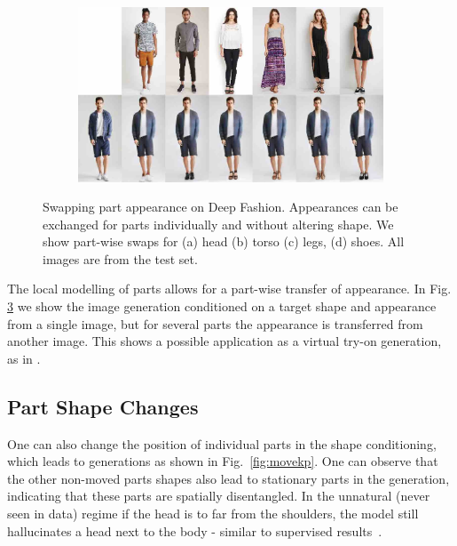 \begin{figure}[htp]
\begin{subfigure}{0.49\linewidth}
		\label{fig:part3_21}
		\end{subfigure}
		\begin{subfigure}{0.49\linewidth}
		\centering
		\includegraphics[trim={0cm 0cm 0cm 0cm},clip, width=1.\linewidth]{fig/factor/part6_30}\caption{}
		\label{fig:part3_30}
		\end{subfigure}
		\caption{Swapping part appearance on Deep Fashion. Appearances can be exchanged for parts individually and without altering shape. We show part-wise swaps for (a) head (b) torso (c) legs, (d) shoes. All images are from the test set.}
		\label{fig:partswaps}
	\end{figure}

	The local modelling of parts allows for a part-wise transfer of appearance. In Fig. \ref{fig:partswaps} we show the image generation conditioned on a target shape and appearance from a single image, but for several parts the appearance is transferred from another image. This shows a possible application as a virtual try-on generation, as in \cite{han17viton}.

	\subsection{Part Shape Changes}\label{sec:partshape}
	One can also change the position of individual parts in the shape conditioning, which leads to generations as shown in Fig.~\ref{fig:movekp}. One can observe that the other non-moved parts shapes also lead to stationary parts in the generation, indicating that these parts are spatially disentangled. In the unnatural (never seen in data) regime \eg if the head is to far from the shoulders, the model still hallucinates a head next to the body - similar to supervised results~\cite{debem18dgpose}.

